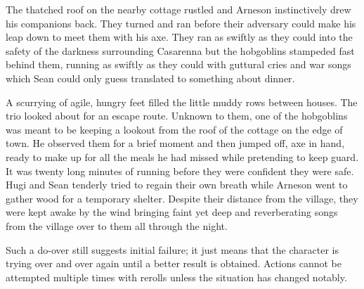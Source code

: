 \begin{multicols}{2}
{\begin{exampletext}
	The thatched roof on the nearby cottage rustled and Arneson instinctively drew his companions back.
	They turned and ran before their adversary could make his leap down to meet them with his axe.
	They ran as swiftly as they could into the safety of the darkness surrounding Casarenna but the hobgoblins stampeded fast behind them, running as swiftly as they could with guttural cries and war songs which Sean could only guess translated to something about dinner.


	A scurrying of agile, hungry feet filled the little muddy rows between houses. The trio looked about for an escape route. Unknown to them, one of the hobgoblins was meant to be keeping a lookout from the roof of the cottage on the edge of town. He observed them for a brief moment and then jumped off, axe in hand, ready to make up for all the meals he had missed while pretending to keep guard.
	It was twenty long minutes of running before they were confident they were safe.
	Hugi and Sean tenderly tried to regain their own breath while Arneson went to gather wood for a temporary shelter.
	Despite their distance from the village, they were kept awake by the wind bringing faint yet deep and reverberating songs from the village over to them all through the night.

	\end{exampletext}
}{}

\iftoggle{verbose}{
\subsection{What the Dice Mean}

You might think of the dice as representing random chance in the environment. Just how irritated is that person you're trying to question, and how creative is that craftsman feeling today? Dice are never re-rolled for different results on the same action because once the dice have told you what the situation is, the situation stays put.

}{
\subsection{No Rerolls}
Characters attempting to change a Standard Action into a \gls{restingaction} do not reroll but rather keep the same roll and turn one die up to show a 6, because while spending more time on a task can be very useful, sometimes the environment simply tells you `no'.
}%
Such a do-over still suggests initial failure; it just means that the character is trying over and over again until a better result is obtained.
Actions cannot be attempted multiple times with rerolls unless the situation has changed notably.

\end{multicols}


